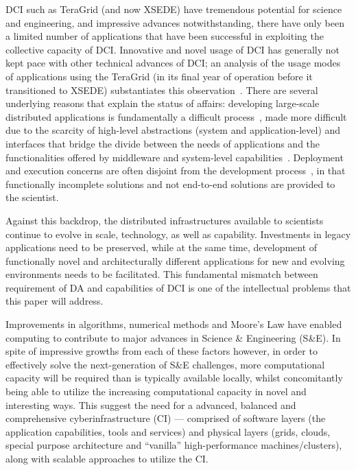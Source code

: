 \documentclass[a4paper,12pt]{article}
\begin{document}
DCI such as TeraGrid (and now XSEDE) have tremendous potential for
science and engineering, and impressive advances notwithstanding,
there have only been a limited number of applications that have been
successful in exploiting the collective capacity of DCI.  Innovative
and novel usage of DCI has generally not kept pace with other
technical advances of DCI; an analysis of the usage modes of
applications using the TeraGrid (in its final year of operation before
it transitioned to XSEDE) substantiates this
observation~\cite{katz-usagemode}. There are several underlying
reasons that explain the status of affairs: developing large-scale
distributed applications is fundamentally a difficult
process~\cite{dpagrid2009, dpa-surveypaper}, made more difficult due
to the scarcity of high-level abstractions (system and
application-level) and interfaces that bridge the divide between the
needs of applications and the functionalities offered by middleware
and system-level capabilities~\cite{saga_data_intensive_abstractions}.
Deployment and execution concerns are often disjoint from the
development process~\cite{dpagrid2009}, in that functionally
incomplete solutions and not end-to-end solutions are provided to the
scientist.


Against this backdrop, the distributed infrastructures available to
scientists continue to evolve in scale, technology, as well as
capability.  Investments in legacy applications need to be preserved,
while at the same time, development of functionally novel and
architecturally different applications for new and evolving
environments needs to be facilitated.  This fundamental mismatch
between requirement of DA and capabilities of DCI is one of the
intellectual problems that this paper will address.




Improvements in algorithms, numerical methods and Moore's Law have
enabled computing to contribute to major advances in Science \&
Engineering (S\&E). In spite of impressive growths from each of these
factors however, in order to effectively solve the next-generation of
S\&E challenges, more computational capacity will be required than is
typically available locally, whilst concomitantly being able to
utilize the increasing computational capacity in novel and interesting
ways. This suggest the need for a advanced, balanced and comprehensive
cyberinfrastructure (CI) --- comprised of software layers (the
application capabilities, tools and services) and physical layers
(grids, clouds, special purpose architecture and ``vanilla''
high-performance machines/clusters), along with scalable approaches to
utilize the CI.
\end{document}
